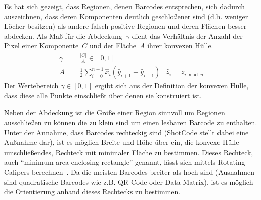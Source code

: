 \begin{enumerate}[(1)]
Es hat sich gezeigt, dass Regionen, denen Barcodes entsprechen, sich dadurch auszeichnen, dass deren Komponenten deutlich geschloßener sind (d.h. weniger Löcher besitzen) als andere falsch-positive Regionen und deren Flächen besser abdecken.
Als Maß für die Abdeckung~$\gamma$ dient das Verhältnis der Anzahl der Pixel einer Komponente~$C$ und der Fläche~$A$ \cite{braden1986} ihrer konvexen Hülle.
\begin{align}
  \gamma &= \frac{|C|}{A} \in [0,1] \\
       A &= \frac{1}{2} \sum_{i=0}^{n-1}{\hat x_i (\hat y_{i+1} - \hat y_{i-1})}
         & \hat z_i = z_{i \bmod n}
\end{align}
Der Wertebereich $\gamma\in[0,1]$ ergibt sich aus der Definition der konvexen Hülle, dass diese alle Punkte einschließt über denen sie konstruiert ist.

Neben der Abdeckung ist die Größe einer Region sinnvoll um Regionen ausschließen zu können die zu klein sind um einen lesbaren Barcode zu enthalten.
Unter der Annahme, dass Barcodes rechteckig sind (ShotCode stellt dabei eine Außnahme dar), ist es möglich Breite und Höhe über ein, die konvexe Hülle umschließendes, Rechteck mit minimaler Fläche zu bestimmen.
Dieses Rechteck, auch "`minimum area enclosing rectangle"' genannt, lässt sich mittels Rotating Calipers berechnen~\cite{arnon1983}.
Da die meisten Barcodes breiter als hoch sind (Ausnahmen sind quadratische Barcodes wie z.B. QR Code oder Data Matrix), ist es möglich die Orientierung anhand dieses Rechtecks zu bestimmen.
\end{enumerate}


